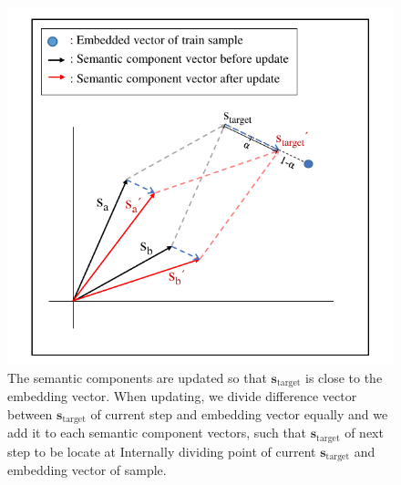 \begin{figure}[!htb] %
  \includegraphics[width=\columnwidth]{../../figures/update.pdf}
  \caption{The semantic components are updated so that $ \mathbf{s}_{\text{target}} $ is close to the embedding vector. When updating, we divide difference vector between $\mathbf{s}_{\text{target}}$ of current step and embedding vector equally and we add it to each semantic component vectors, such that $\mathbf{s}_{\text{target}}$ of next step to be locate at Internally dividing point of current $\mathbf{s}_{\text{target}}$ and embedding vector of sample. 
}
  \label{fig:update}
\end{figure}


